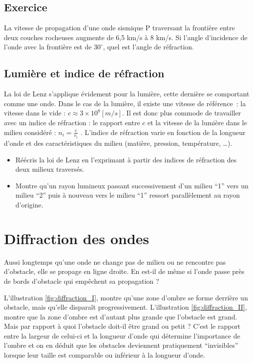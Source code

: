 \subsection{Exercice}
La vitesse de propagation d'une onde sismique P traversant la frontière entre deux couches rocheuses augmente de 6,5 km/s à 8 km/s. Si l'angle d'incidence de l'onde avec la frontière est de \(30^{\circ}\), quel est l'angle de réfraction.

\subsection{Lumière et indice de réfraction}
La loi de Lenz s'applique évidement pour la lumière, cette dernière se comportant comme une onde. Dans le cas de la lumière, il existe une vitesse de référence : la vitesse dans le vide : \(c \approx 3 \times 10^8 [m/s]\). Il est donc plus commode de travailler avec un indice de réfraction : le rapport entre \(c\) et la vitesse de la lumière dans le milieu considéré : \(n_i=\frac{c}{v_i}\) . L'indice de réfraction varie en fonction de la longueur d'onde et des caractéristiques du milieu (matière, pression, température, \ldots).
\begin{itemize}
    \item Réécris la loi de Lenz en l'exprimant à partir des indices de réfraction des deux milieux traversés.
    \item Montre qu'un rayon lumineux passant successivement d'un milieu \enquote{1} vers un milieu \enquote{2} puis à nouveau vers le milieu \enquote{1} ressort parallèlement au rayon d'origine.
\end{itemize}

\newpage

\section{Diffraction des ondes}
Aussi longtemps qu'une onde ne change pas de milieu ou ne rencontre pas d'obstacle, elle se propage en ligne droite. En est-il de même si l'onde passe près de bords d'obstacle qui empêchent sa propagation ?

L'illustration \ref{fig:diffraction_I}, montre qu'une zone d'ombre se forme derrière un obstacle, mais qu'elle disparaît progressivement. L'illustration \ref{fig:diffraction_II}, montre que la zone d'ombre est d'autant plus grande que l'obstacle est grand.
Mais par rapport à quoi l'obstacle doit-il être grand ou petit ? C'est le rapport entre la largeur de celui-ci et la longueur d'onde qui détermine l'importance de l'ombre et on en déduit que les obstacles deviennent pratiquement \enquote{invisibles} lorsque leur taille est comparable ou inférieur à la longueur d'onde.

